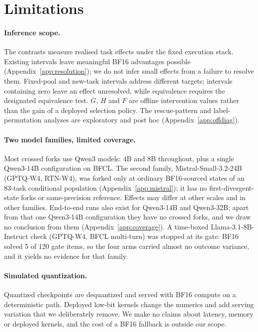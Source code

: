 \section*{Limitations}

\paragraph{Inference scope.} The contrasts measure realised task effects under the fixed execution stack. Existing intervals leave meaningful BF16 advantages possible (Appendix~\ref{app:resolution}); we do not infer small effects from a failure to resolve them. Fixed-pool and new-task intervals address different targets; intervals containing zero leave an effect unresolved, while equivalence requires the designated equivalence test. $G$, $H$ and $F$ are offline intervention values rather than the gain of a deployed selection policy. The rescue-pattern and label-permutation analyses are exploratory and post hoc (Appendix~\ref{app:offdiag}).

\paragraph{Two model families, limited coverage.} Most crossed forks use Qwen3 models: 4B and 8B throughout, plus a single Qwen3-14B configuration on BFCL. %
The second family, Mistral-Small-3.2-24B (GPTQ-W4, RTN-W4), was forked only at ordinary BF16-sourced \tautwo{} states of an 83-task conditional population (Appendix~\ref{app:mistral}); it has no first-divergent-state forks or same-precision reference. %
Effects may differ at other scales and in other families. End-to-end runs also exist for Qwen3-14B and Qwen3-32B; apart from that one Qwen3-14B configuration they have no crossed forks, and we draw no conclusion from them (Appendix~\ref{app:coverage}). A time-boxed Llama-3.1-8B-Instruct check (GPTQ-W4, BFCL multi-turn) was stopped at its gate: BF16 solved 5 of 120 gate items, so the four arms carried almost no outcome variance, and it yields no evidence for that family. %

\paragraph{Simulated quantization.} Quantized checkpoints are dequantized and served with BF16 compute on a deterministic path. Deployed low-bit kernels change the numerics and add serving variation that we deliberately remove. We make no claims about latency, memory or deployed kernels, and the cost of a BF16 fallback is outside our scope.

